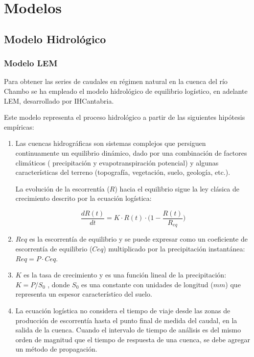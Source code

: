 \chapter{Modelos}
\label{capitulo 2}

\section{Modelo Hidrológico}

\subsection{Modelo LEM}
Para obtener las series de caudales en régimen natural en la cuenca del río Chambo se ha empleado el 
modelo hidrológico  de equilibrio logístico, en adelante LEM, desarrollado por IHCantabria. 

Este modelo representa el proceso hidrológico a partir de las siguientes hipótesis empíricas:

\begin{enumerate}
    \item Las cuencas hidrográficas son sistemas complejos que persiguen continuamente un equilibrio dinámico, 
    dado por una combinación de factores climáticos ( precipitación y evapotranspiración potencial) 
    y algunas características del terreno (topografía, vegetación, suelo, geología, etc.). 

    La evolución de la escorrentía ($R$) hacia el equilibrio sigue la ley clásica de crecimiento descrito por la 
    ecuación logística:

    \begin{equation}
        \frac{d R(t)}{dt}=K\cdot R(t)\cdot\big(1-\frac{R(t)}{R_{eq}}\big)
    \label{eq.log}
    \end{equation}

    \item  $Req$ es la escorrentía de equilibrio  y se puede expresar como un coeficiente de escorrentía de 
    equilibrio ($Ceq$) multiplicado por la precipitación instantánea: $Req = P \cdot Ceq$. 
    
    \item $K$ es la tasa de crecimiento y es una función lineal de la precipitación: $K=P/S_0$ , donde $S_0$ 
    es una constante con unidades de longitud ($mm$) que representa un espesor característico del suelo.
    \item La ecuación logística no considera el  tiempo de viaje desde las 
    zonas de producción de escorrentía hasta el punto final de medida del caudal, en la salida de la cuenca. 
    Cuando el intervalo de tiempo de análisis es del mismo orden de magnitud que el tiempo 
    de respuesta de una cuenca, se debe agregar un método de propagación.


\end{enumerate}

